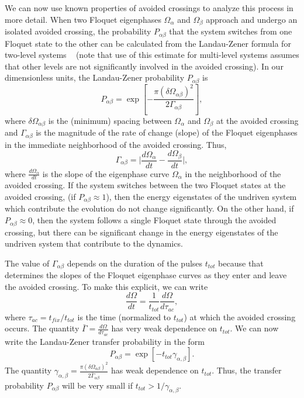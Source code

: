 \documentclass{article}
\begin{document}
We can now use known properties of avoided crossings to analyze this process in more detail. 
When two Floquet eigenphases $\Omega_\alpha$ and $\Omega_\beta$ approach and undergo an isolated avoided crossing, the probability $P_{\alpha \beta}$ that  the system switches from one Floquet state to the other   can be calculated from the Landau-Zener formula for two-level systems ~\cite{zener:lzformula} (note that use of this estimate for multi-level systems  assumes that other levels are not significantly involved in the avoided crossing). In our dimensionless units, the Landau-Zener probability $P_{\alpha \beta}$ is
%
\begin{equation}
P_{\alpha \beta}=\exp\left[-\frac{\pi ({\delta \Omega_{\alpha \beta}})^2}{2\Gamma_{\alpha \beta}}\right],
\label{eq:landauzener}
\end{equation}
%
where $\delta\Omega_{\alpha\beta}$ is the (minimum) spacing  between $\Omega_\alpha$ and $\Omega_\beta$ at the avoided crossing and $\Gamma_{\alpha\beta}$   is the magnitude of the  rate of change (slope) of the Floquet eigenphases in the immediate neighborhood of the avoided crossing. Thus,
%
\begin{equation}
\Gamma_{\alpha\beta} = {\biggl|} \frac{d\Omega_\alpha}{dt} - \frac{d\Omega_\beta}{dt}{\biggr|},
\label{eq:gamma}
\end{equation}
%
where  $\frac{d\Omega_\alpha}{dt}$ is the slope of the  eigenphase curve $\Omega_\alpha$ in the neighborhood of the avoided crossing. If the system switches between the two Floquet states at the avoided crossing, (if $P_{\alpha \beta}{\approx}1$),  then the energy eigenstates of the undriven system which contribute the evolution do not change significantly.  On the other hand, if $P_{\alpha \beta}{\approx}0$, then the system follows a single Floquet state through the avoided crossing, but there can be significant change in the energy eigenstates of the undriven system that contribute to the dynamics. 

The value of $\Gamma_{\alpha\beta}$ depends on the duration of the pulses $t_{tot}$ because that determines the slopes of the Floquet eigenphase curves as they enter and leave the avoided crossing. To make this explicit, we can write 
%
\begin{equation}
\frac{d{\Omega}}{dt}=\frac{1}{t_{tot}}\frac{d{\Omega}}{d{\tau_{ac}}},
\end{equation}
%
where $\tau_{ac}=t_{fix}/t_{tot}$ is the time (normalized to $t_{tot}$) at which the avoided crossing 
occurs. The quantity ${\bar \Gamma}=\frac{{d\Omega}}{d{\tau}_{ac}}$  has very weak dependence on  $t_{tot}$. We can now write the Landau-Zener transfer probability in the form
%
\begin{equation}
P_{\alpha \beta}=\exp\left[-t_{tot}{\gamma}_{\alpha,\beta} \right].
\label{eq:lanzen}
\end{equation}
%
The quantity ${\gamma}_{\alpha,\beta}=\frac{\pi ({\delta \Omega_{\alpha \beta}})^2}{2{\bar \Gamma}_{\alpha \beta}}$ has  weak dependence on $t_{tot}$. Thus, the transfer probability $P_{\alpha \beta}$ will be very small if $t_{tot}>1/{\gamma}_{\alpha,\beta}$. 
\end{document}
